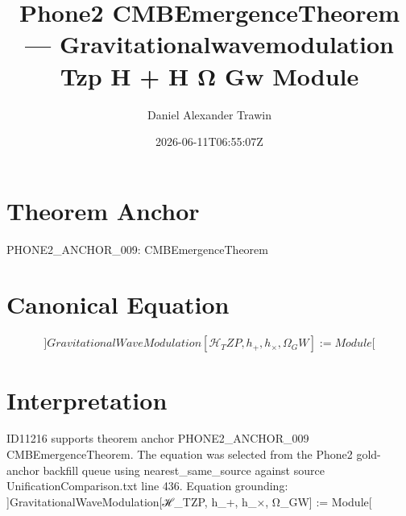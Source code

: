 \documentclass[11pt]{article}
\title{Phone2 CMBEmergenceTheorem — Gravitationalwavemodulation Tzp H + H Ω Gw Module}
\author{Daniel Alexander Trawin}
\date{2026-06-11T06:55:07Z}
\begin{document}
\maketitle
\section*{Theorem Anchor}
PHONE2_ANCHOR_009: CMBEmergenceTheorem
\section*{Canonical Equation}
\[
]GravitationalWaveModulation[ℋ_TZP, h_+, h_×, Ω_GW] := Module[
\]
\section*{Interpretation}
ID11216 supports theorem anchor PHONE2_ANCHOR_009 CMBEmergenceTheorem. The equation was selected from the Phone2 gold-anchor backfill queue using nearest_same_source against source UnificationComparison.txt line 436. Equation grounding: ]GravitationalWaveModulation[ℋ_TZP, h_+, h_×, Ω_GW] := Module[
\end{document}

